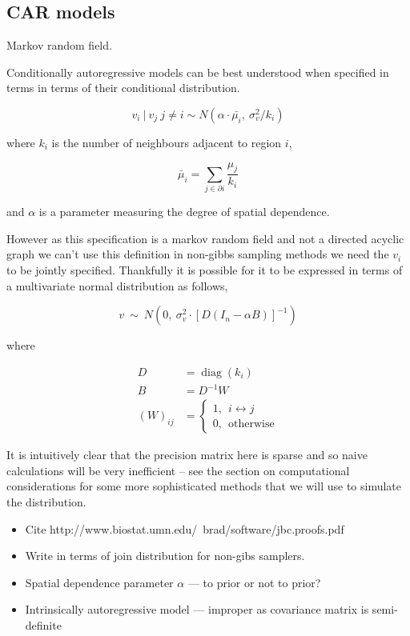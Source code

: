 \documentclass{article}
\begin{document}
\subsection{CAR models}

Markov random field.

Conditionally autoregressive models can be best understood when specified in terms in terms of their conditional distribution. 

\begin{equation}
v_i \ | \ v_j \ j \neq i \sim N(\alpha \cdot \bar{\mu_i}, \ \sigma_v^2/k_i)
\end{equation}

where $k_i$ is the number of neighbours adjacent to region $i$,

\begin{equation}
\bar{\mu}_i = \sum_{j \in \partial i} \frac{\mu_j}{k_i}
\end{equation}

and $\alpha$ is a parameter measuring the degree of spatial dependence. 

However as this specification is a markov random field and not a directed acyclic graph we can't use this definition in non-gibbs sampling methods \- we need the $v_i$ to be jointly specified. Thankfully it is possible for it to be expressed in terms of a multivariate normal distribution as follows,

\begin{equation}
v \ \sim \ N(0, \ \sigma_v^2 \cdot {[D(I_n - \alpha B)]}^{-1})
\end{equation}

where

\begin{align}
D &= \operatorname{diag}(k_i) \\
B &= D^{-1} W \\
{(W)}_{ij} &= 
\begin{cases}
1, \ \ i \leftrightarrow j \\
0, \ \ \textrm{otherwise}
\end{cases}
\end{align} 

It is intuitively clear that the precision matrix here is sparse and so naive calculations will be very inefficient -- see the section on computational considerations for some more sophisticated methods that we will use to simulate the distribution.

\begin{itemize}

\item Cite http://www.biostat.umn.edu/~brad/software/jbc.proofs.pdf

\item Write in terms of join distribution for non-gibs samplers.

\item Spatial dependence parameter $\alpha$ --- to prior or not to prior?

\item Intrinsically autoregressive model --- improper as covariance matrix is semi-definite

\end{itemize}
\end{document}
